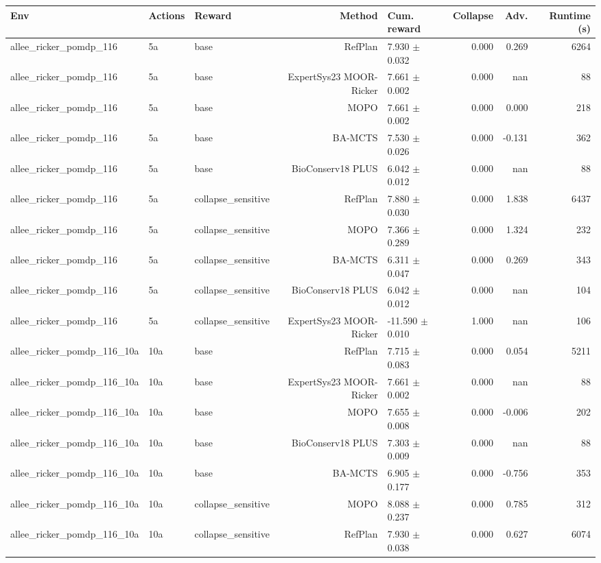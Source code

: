 \documentclass{article}
\begin{document}
\begin{longtable}{lllrlrrr}
\toprule
Env & Actions & Reward & Method & Cum. reward & Collapse & Adv. & Runtime (s) \\
\midrule
allee\_ricker\_pomdp\_116 & 5a & base & RefPlan & 7.930 $\pm$ 0.032 & 0.000 & 0.269 & 6264 \\
allee\_ricker\_pomdp\_116 & 5a & base & ExpertSys23 MOOR-Ricker & 7.661 $\pm$ 0.002 & 0.000 & nan & 88 \\
allee\_ricker\_pomdp\_116 & 5a & base & MOPO & 7.661 $\pm$ 0.002 & 0.000 & 0.000 & 218 \\
allee\_ricker\_pomdp\_116 & 5a & base & BA-MCTS & 7.530 $\pm$ 0.026 & 0.000 & -0.131 & 362 \\
allee\_ricker\_pomdp\_116 & 5a & base & BioConserv18 PLUS & 6.042 $\pm$ 0.012 & 0.000 & nan & 88 \\
allee\_ricker\_pomdp\_116 & 5a & collapse\_sensitive & RefPlan & 7.880 $\pm$ 0.030 & 0.000 & 1.838 & 6437 \\
allee\_ricker\_pomdp\_116 & 5a & collapse\_sensitive & MOPO & 7.366 $\pm$ 0.289 & 0.000 & 1.324 & 232 \\
allee\_ricker\_pomdp\_116 & 5a & collapse\_sensitive & BA-MCTS & 6.311 $\pm$ 0.047 & 0.000 & 0.269 & 343 \\
allee\_ricker\_pomdp\_116 & 5a & collapse\_sensitive & BioConserv18 PLUS & 6.042 $\pm$ 0.012 & 0.000 & nan & 104 \\
allee\_ricker\_pomdp\_116 & 5a & collapse\_sensitive & ExpertSys23 MOOR-Ricker & -11.590 $\pm$ 0.010 & 1.000 & nan & 106 \\
allee\_ricker\_pomdp\_116\_10a & 10a & base & RefPlan & 7.715 $\pm$ 0.083 & 0.000 & 0.054 & 5211 \\
allee\_ricker\_pomdp\_116\_10a & 10a & base & ExpertSys23 MOOR-Ricker & 7.661 $\pm$ 0.002 & 0.000 & nan & 88 \\
allee\_ricker\_pomdp\_116\_10a & 10a & base & MOPO & 7.655 $\pm$ 0.008 & 0.000 & -0.006 & 202 \\
allee\_ricker\_pomdp\_116\_10a & 10a & base & BioConserv18 PLUS & 7.303 $\pm$ 0.009 & 0.000 & nan & 88 \\
allee\_ricker\_pomdp\_116\_10a & 10a & base & BA-MCTS & 6.905 $\pm$ 0.177 & 0.000 & -0.756 & 353 \\
allee\_ricker\_pomdp\_116\_10a & 10a & collapse\_sensitive & MOPO & 8.088 $\pm$ 0.237 & 0.000 & 0.785 & 312 \\
allee\_ricker\_pomdp\_116\_10a & 10a & collapse\_sensitive & RefPlan & 7.930 $\pm$ 0.038 & 0.000 & 0.627 & 6074 \\

\end{longtable}
\end{document}

